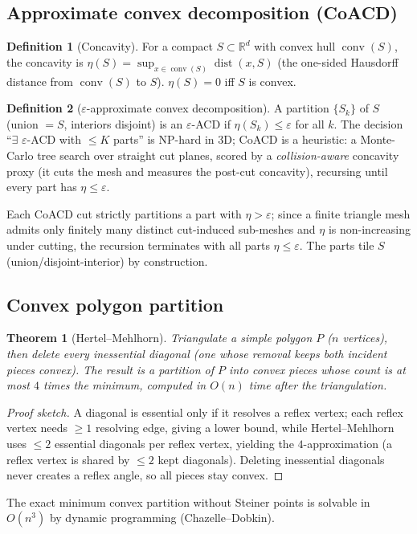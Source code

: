 \documentclass[11pt]{article}
\theoremstyle{definition}\newtheorem{definition}{Definition}[section]
\theoremstyle{plain}\newtheorem{theorem}{Theorem}[section]
\newcommand{\R}{\mathbb{R}}\newcommand{\Z}{\mathbb{Z}}\newcommand{\Norm}[1]{\lVert #1\rVert}
\DeclareMathOperator{\conv}{conv}\DeclareMathOperator*{\argmin}{arg\,min}
\begin{document}
\subsection{Approximate convex decomposition (CoACD)}
\begin{definition}[Concavity]
For a compact $S\subset\R^d$ with convex hull $\conv(S)$, the concavity is
$\eta(S)=\sup_{x\in\conv(S)}\operatorname{dist}(x,S)$ (the one-sided Hausdorff distance from $\conv(S)$ to
$S$). $\eta(S)=0$ iff $S$ is convex.
\end{definition}
\begin{definition}[$\varepsilon$-approximate convex decomposition]
A partition $\{S_k\}$ of $S$ (union $=S$, interiors disjoint) is an $\varepsilon$-ACD if $\eta(S_k)\le\varepsilon$
for all $k$. The decision ``$\exists$ $\varepsilon$-ACD with $\le K$ parts'' is NP-hard in 3D; CoACD is a
heuristic: a Monte-Carlo tree search over straight cut planes, scored by a \emph{collision-aware} concavity
proxy (it cuts the mesh and measures the post-cut concavity), recursing until every part has
$\eta\le\varepsilon$.
\end{definition}
\begin{proposition}
Each CoACD cut strictly partitions a part with $\eta>\varepsilon$; since a finite triangle mesh admits only
finitely many distinct cut-induced sub-meshes and $\eta$ is non-increasing under cutting, the recursion
terminates with all parts $\eta\le\varepsilon$. The parts tile $S$ (union/disjoint-interior) by construction.
\end{proposition}

\subsection{Convex polygon partition}
\begin{theorem}[Hertel--Mehlhorn]\label{thm:hm}
Triangulate a simple polygon $P$ ($n$ vertices), then delete every \emph{inessential} diagonal (one whose
removal keeps both incident pieces convex). The result is a partition of $P$ into convex pieces whose count is
at most $4$ times the minimum, computed in $O(n)$ time after the triangulation.
\end{theorem}
\begin{proof}[Proof sketch]
A diagonal is essential only if it resolves a reflex vertex; each reflex vertex needs $\ge1$ resolving edge,
giving a lower bound, while Hertel--Mehlhorn uses $\le2$ essential diagonals per reflex vertex, yielding the
$4$-approximation (a reflex vertex is shared by $\le2$ kept diagonals). Deleting inessential diagonals never
creates a reflex angle, so all pieces stay convex.
\end{proof}
\noindent The exact minimum convex partition without Steiner points is solvable in $O(n^3)$ by dynamic
programming (Chazelle--Dobkin).
\end{document}
